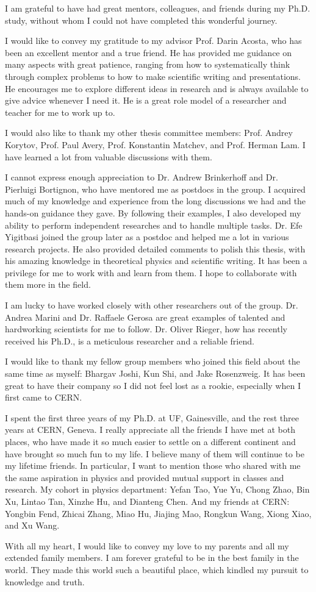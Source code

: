 \justify

\hspace{2em} I am grateful to have had great mentors, colleagues, and friends during my Ph.D. study,
without whom I could not have completed this wonderful journey.

I would like to convey my gratitude to my advisor Prof. Darin Acosta,
who has been an excellent mentor and a true friend.
He has provided me guidance on many aspects with great patience, 
ranging from how to systematically think through complex problems 
to how to make scientific writing and presentations.
He encourages me to explore different ideas in research and is always available to give advice whenever I need it.
He is a great role model of a researcher and teacher for me to work up to.

I would also like to thank my other thesis committee members:
Prof. Andrey Korytov, Prof. Paul Avery, Prof. Konstantin Matchev, and Prof. Herman Lam.
I have learned a lot from valuable discussions with them.

I cannot express enough appreciation to Dr. Andrew Brinkerhoff and Dr. Pierluigi Bortignon,
who have mentored me as postdocs in the group.
I acquired much of my knowledge and experience from the long discussions we had and the hands-on guidance they gave.
By following their examples, I also developed my ability to perform independent researches and to handle multiple tasks.
Dr. Efe Yigitbasi joined the group later as a postdoc and helped me a lot in various research projects.
He also provided detailed comments to polish this thesis, with his amazing knowledge in theoretical physics and scientific writing.
It has been a privilege for me to work with and learn from them.
I hope to collaborate with them more in the field. 

I am lucky to have worked closely with other researchers out of the group.
Dr. Andrea Marini and Dr. Raffaele Gerosa are great examples of talented and hardworking scientists for me to follow.
Dr. Oliver Rieger, how has recently received his Ph.D., is a meticulous researcher and a reliable friend. 

I would like to thank my fellow group members who joined this field about the same time as myself:
Bhargav Joshi, Kun Shi, and Jake Rosenzweig.
It has been great to have their company so I did not feel lost as a rookie, especially when I first came to CERN. 

I spent the first three years of my Ph.D. at UF, Gainesville, and the rest three years at CERN, Geneva.
I really appreciate all the friends I have met at both places, 
who have made it so much easier to settle on a different continent and have brought so much fun to my life.
I believe many of them will continue to be my lifetime friends.
In particular, I want to mention those who shared with me the same aspiration in physics and provided mutual support in classes and research.
My cohort in physics department: Yefan Tao, Yue Yu, Chong Zhao, Bin Xu, Lintao Tan, Xinzhe Hu, and Dianteng Chen.
And my friends at CERN: Yongbin Fend, Zhicai Zhang, Miao Hu, Jiajing Mao, Rongkun Wang, Xiong Xiao, and Xu Wang.

With all my heart, I would like to convey my love to my parents and all my extended family members.
I am forever grateful to be in the best family in the world.
They made this world such a beautiful place, which kindled my pursuit to knowledge and truth.
